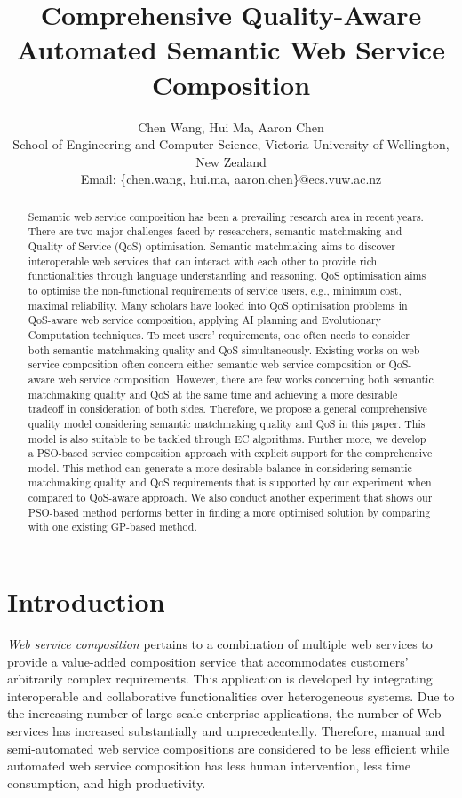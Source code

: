\documentclass{IEEEtran}
\title{Comprehensive Quality-Aware Automated Semantic Web Service Composition}
\author{Chen Wang, Hui Ma, Aaron Chen\\ \small School of
Engineering and Computer Science, Victoria University of Wellington, New Zealand\\
Email: \{chen.wang, hui.ma, aaron.chen\}@ecs.vuw.ac.nz}
\begin{document}
\maketitle
\begin{abstract}
Semantic web service composition has been a prevailing research area in recent years. There are two major challenges faced by researchers, semantic matchmaking and Quality of Service (QoS) optimisation. Semantic matchmaking aims to discover interoperable web services that can interact with each other to provide rich functionalities through language understanding and reasoning. QoS optimisation aims to optimise the non-functional requirements of service users, e.g., minimum cost, maximal reliability. Many scholars have looked into QoS optimisation problems in QoS-aware web service composition, applying AI planning and Evolutionary Computation techniques. To meet users' requirements, one often needs to consider both semantic matchmaking quality and QoS simultaneously. Existing works on web service composition often concern either semantic web  service composition or QoS-aware web service composition. However, there are few works concerning both semantic matchmaking quality and QoS at the same time and achieving a more desirable tradeoff in consideration of both sides. Therefore, we propose a general comprehensive quality model considering semantic matchmaking quality and QoS in this paper. This model is also suitable to be tackled through EC algorithms. Further more, we develop a PSO-based service composition approach with explicit support for the comprehensive model. This method can generate a more desirable balance in considering semantic matchmaking quality and QoS requirements that is supported by our experiment when compared to QoS-aware approach. We also conduct another experiment that shows our PSO-based method performs better in finding a more optimised solution by comparing with one existing GP-based method.

\end{abstract}
\section{Introduction}\label{introduction}

\textit{Web service composition} pertains to a combination of multiple web services to provide a value-added composition service that accommodates customers' arbitrarily complex requirements. This application is developed by integrating interoperable and collaborative functionalities over heterogeneous systems. Due to the increasing number of large-scale enterprise applications, the number of Web services has increased substantially and unprecedentedly. Therefore, manual and semi-automated web service compositions are considered to be less efficient while automated web service composition has less human intervention, less time consumption, and high productivity.
\end{document}
